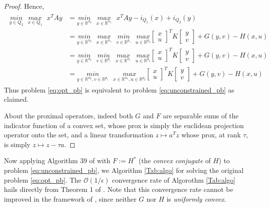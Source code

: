 \documentclass{article} %
\begin{document}
\begin{proof}
Hence,
\begin{eqnarray*}
  \begin{split}
    \underset{y \in Q_2}{min}\text{ }\underset{x \in Q_1}{max}\text{ }x^TAy &=
    \underset{y \in \mathbb{R}^{n_2}}{min}\text{ }\underset{x \in \mathbb{R}^{n_1}}{max}\text{ }x^TAy - i_{Q_1}(x) + i_{Q_2}(y)\\
    &= \underset{y \in \mathbb{R}^{n_2}}{min}\text{ }\underset{x \in \mathbb{R}^{n_1}}{max}\text{ }
\underset{v\in \mathbb{R}^{p_1}}{min}\text{ }\underset{u \in \mathbb{R}^{p_2}}{max}
      {\begin{bmatrix}x\\u\end{bmatrix}^TK\begin{bmatrix}y\\v\end{bmatrix} + G(y, v) - H(x, u)}\\
    &= \underset{y \in \mathbb{R}^{n_2}}{min}\text{ }\underset{v\in \mathbb{R}^{p_1}}{min}\text{ }\underset{x \in \mathbb{R}^{n_1}}{max}\text{ }
\underset{u \in \mathbb{R}^{p_2}}{max}
      {\begin{bmatrix}x\\u\end{bmatrix}^TK\begin{bmatrix}y\\v\end{bmatrix} + G(y, v) - H(x, u)}\\
      &=     \underset{y \in \mathbb{R}^{n_2}, v\in \mathbb{R}^{p_1}}{min}\text{ }\underset{x \in \mathbb{R}^{n_1}, u \in \mathbb{R}^{p_2}}{max}
           {\begin{bmatrix}x\\u\end{bmatrix}^TK\begin{bmatrix}y\\v\end{bmatrix} + G(y, v) - H(x, u)}
  \end{split}
\end{eqnarray*}
Thus problem \eqref{eq:opt_pb} is equivalent to problem \eqref{eq:unconstrained_pb} as claimed.

About the proximal operators, indeed both $G$ and $F$ are separable sums of the indicator function of a convex set, whose prox is simply the euclidean projection operator onto the set,  and a linear transformation $z \mapsto a^Tz$ whose prox, at rank $\tau$, is simply $z \mapsto z - \tau a$.
\end{proof}
Now applying Algorithm 39 of \cite{chambolle2010} with $F := H^*$ (the \textit{convex conjugate} of $H$)
 to problem \eqref{eq:unconstrained_pb}, we Algorithm \ref{Tab:algo} for solving the original problem \eqref{eq:opt_pb}. The $\mathcal{O}(1/\epsilon)$ convergence rate of Algorothm \ref{Tab:algo} hails directly from Theorem 1 of \cite{chambolle2010}. Note that this convergence rate cannot be improved in the framework of \cite{chambolle2010}, since neither $G$ nor $H$ is \textit{uniformly convex}.
\end{document}
